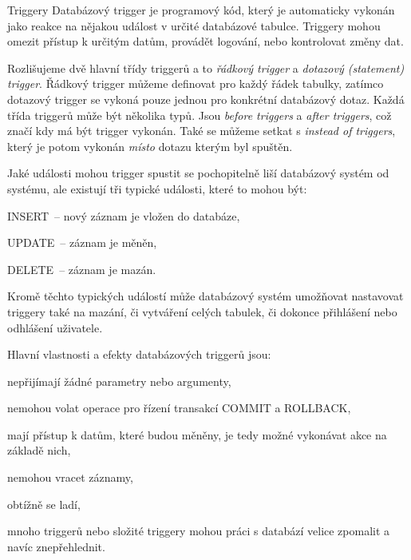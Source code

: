 \begin{obecne}{Triggery}
  Databázový trigger je programový kód, který je automaticky vykonán jako
  reakce na nějakou událost v určité databázové tabulce. Triggery mohou omezit
  přístup k určitým datům, provádět logování, nebo kontrolovat změny dat.

  Rozlišujeme dvě hlavní třídy triggerů a to \emph{řádkový trigger} a
  \emph{dotazový (statement) trigger}. Řádkový trigger můžeme definovat pro
  každý řádek tabulky, zatímco dotazový trigger se vykoná pouze jednou pro
  konkrétní databázový dotaz. Každá třída triggerů může být několika typů. Jsou
  \emph{before triggers} a \emph{after triggers}, což značí kdy má být trigger
  vykonán. Také se můžeme setkat s \emph{instead of triggers}, který je potom
  vykonán \emph{místo} dotazu kterým byl spuštěn. 

  Jaké události mohou trigger spustit se pochopitelně liší databázový systém od
  systému, ale existují tři typické události, které to mohou být:
  \begin{penumerate}
    \item INSERT~-- nový záznam je vložen do databáze,
    \item UPDATE~-- záznam je měněn,
    \item DELETE~-- záznam je mazán.
  \end{penumerate}
  Kromě těchto typických událostí může databázový systém umožňovat nastavovat
  triggery také na mazání, či vytváření celých tabulek, či dokonce přihlášení
  nebo odhlášení uživatele.

  Hlavní vlastnosti a efekty databázových triggerů jsou:
  \begin{pitemize}
    \item nepřijímají žádné parametry nebo argumenty,
    \item nemohou volat operace pro řízení transakcí COMMIT a ROLLBACK,
    \item mají přístup k datům, které budou měněny, je tedy možné vykonávat akce
    na základě nich,
    \item nemohou vracet záznamy,
    \item obtížně se ladí,
    \item mnoho triggerů nebo složité triggery mohou práci s databází velice
    zpomalit a navíc znepřehlednit.
  \end{pitemize}
\end{obecne}

